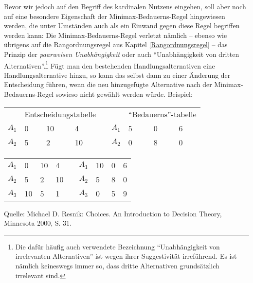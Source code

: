 Bevor wir jedoch auf den Begriff des kardinalen Nutzens eingehen, soll aber
noch auf eine besondere Eigenschaft der Minimax-Bedauerns-Regel hingewiesen
werden, die unter Umständen auch als ein Einwand gegen diese Regel begriffen
werden kann: Die Minimax-Bedauerns-Regel verletzt nämlich -- ebenso wie übrigens auf die
Rangordnungsregel aus Kapitel \ref{Rangordnungsregel} -- das Prinzip der {\em
paarweisen Unabhängigkeit} oder auch "`Unabhängigkeit von dritten
Alternativen"'.\footnote{Die dafür häufig auch verwendete Bezeichnung
"`Unabhängigkeit von irrelevanten Alternativen"' ist wegen ihrer Suggestivität
irreführend. Es ist nämlich keineswegs immer so, dass dritte Alternativen
grundsätzlich irrelevant sind.}
Fügt man den bestehenden Handlungsalternativen eine Handlungsalternative hinzu,
so kann das selbst dann zu einer Änderung der Entscheidung führen, wenn die neu
hinzugefügte Alternative nach der Minimax-Bedauerns-Regel sowieso nicht gewählt
werden würde. Beispiel:

\begin{center}

\setlength{\parskip}{0.5cm}

\begin{tabular}{c|p{1cm}|p{1cm}|p{1cm}|cc|p{1cm}|p{1cm}|p{1cm}|}
\multicolumn{1}{c}{} & \multicolumn{3}{c}{Entscheidungstabelle} &
\multicolumn{2}{c}{} & \multicolumn{3}{c}{"`Bedauerns"'-tabelle}
\\ \cline{2-4} \cline{7-9}
$A_1$ & 0 & 10 & 4    & & $A_1$ & 5 & 0 & 6  \\ 
\cline{2-4} \cline{7-9} 
$A_2$ & 5 &  2 & 10   & & $A_2$ & 0 & 8 & 0  \\ 
\cline{2-4} \cline{7-9}
\end{tabular}

\begin{tabular}{c|p{1cm}|p{1cm}|p{1cm}|cc|p{1cm}|p{1cm}|p{1cm}|}
\cline{2-4} \cline{7-9}
$A_1$ & 0 & 10 & 4  & & $A_1$ & 10 & 0 & 6  \\ 
\cline{2-4} \cline{7-9} 
$A_2$ & 5 &  2 & 10 & & $A_2$ & 5 &  8 & 0  \\ 
\cline{2-4} \cline{7-9}
$A_3$ & 10 &  5 & 1 & & $A_3$ & 0 &  5 & 9 \\ 
\cline{2-4} \cline{7-9}
\end{tabular}

{\tiny Quelle: Michael D. Resnik: Choices. An Introduction to Decision Theory,
Minnesota 2000, S. 31.}
\end{center}

